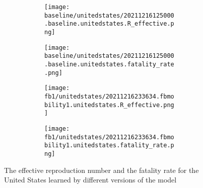 \begin{figure}[!htb]
    \centering

    \begin{subfigure}[b]{\linewidth}
        \centering
        \begin{subfigure}[b]{0.4\linewidth}
            \texttt{[image: baseline/unitedstates/20211216125000.baseline.unitedstates.R\_effective.png]}
        \end{subfigure}
        \begin{subfigure}[b]{0.4\linewidth}
            \texttt{[image: baseline/unitedstates/20211216125000.baseline.unitedstates.fatality\_rate.png]}
        \end{subfigure}
    \end{subfigure}

    \begin{subfigure}[b]{\linewidth}
        \centering
        \begin{subfigure}[b]{0.4\linewidth}
            \texttt{[image: fb1/unitedstates/20211216233634.fbmobility1.unitedstates.R\_effective.png]}
        \end{subfigure}
        \begin{subfigure}[b]{0.4\linewidth}
            \texttt{[image: fb1/unitedstates/20211216233634.fbmobility1.unitedstates.fatality\_rate.png]}
        \end{subfigure}
    \end{subfigure}

    \caption{The effective reproduction number and the fatality rate for the United States learned by different versions of the model}
    \label{fig:R0-and-fatality-usa}
\end{figure}
